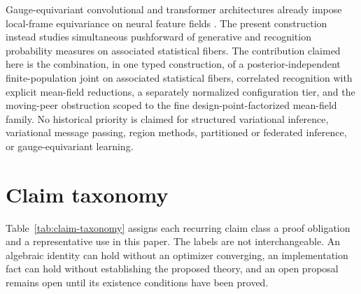 Gauge-equivariant convolutional and transformer architectures already impose local-frame equivariance on neural feature fields \citep{cohen2019gauge,He2021GaugeEquivariantTransformer,Bronstein2021,weiler2021coordinate}. The present construction instead studies simultaneous pushforward of generative and recognition probability measures on associated statistical fibers. The contribution claimed here is the combination, in one typed construction, of a posterior-independent finite-population joint on associated statistical fibers, correlated recognition with explicit mean-field reductions, a separately normalized configuration tier, and the moving-peer obstruction scoped to the fine design-point-factorized mean-field family. No historical priority is claimed for structured variational inference, variational message passing, region methods, partitioned or federated inference, or gauge-equivariant learning.

\section{Claim taxonomy}

Table~\ref{tab:claim-taxonomy} assigns each recurring claim class a proof obligation and a representative use in this paper. The labels are not interchangeable. An algebraic identity can hold without an optimizer converging, an implementation fact can hold without establishing the proposed theory, and an open proposal remains open until its existence conditions have been proved.

